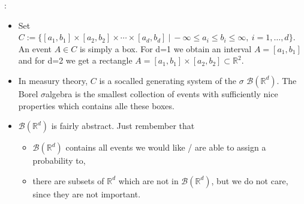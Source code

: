 \documentclass[letterpaper,10pt,english]{jupyterBook}
\begin{document}
\sphinxAtStartPar
{}:
\begin{itemize}
\item {} 
\sphinxAtStartPar
Set \(C := \big\{ [a_1, b_1] \times [a_2, b_2] \times \cdots \times [a_d, b_d]~\big|~-\infty \le a_i \le b_i \le \infty, ~i = 1, \dots, d\big\}\). An event \(A \in C\) is simply a box. For d=1 we obtain an interval \(A = [a_1, b_1]\) and for d=2 we get a rectangle \(A = [a_1, b_1] \times [a_2, b_2] \subset \mathbb{R}^2\).

\item {} 
\sphinxAtStartPar
In measury theory, \(C\) is a so\sphinxhyphen{}called generating system of the  \(\sigma\)\sphinxhyphen{} \(\mathcal{B}(\mathbb{R}^d)\). The Borel \(\sigma\)\sphinxhyphen{}algebra is the smallest collection of events with sufficiently nice properties which contains alle these boxes.

\item {} 
\sphinxAtStartPar
\(\mathcal{B}(\mathbb{R}^d)\) is fairly abstract. Just rembember that
\begin{itemize}
\item {} 
\sphinxAtStartPar
\(\mathcal{B}(\mathbb{R}^d)\) contains all events we would like / are able to assign a probability to,

\item {} 
\sphinxAtStartPar
there are subsets of \(\mathbb{R}^d\) which are not in \(\mathcal{B}(\mathbb{R}^d)\), but we do not care, since they are not important.

\end{itemize}

\end{itemize}
\end{document}
